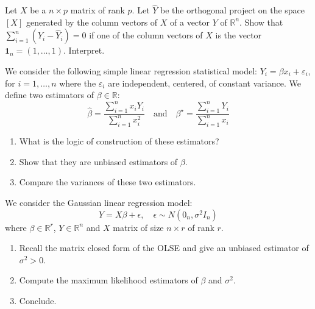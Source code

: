 \begin{exercise}
Let \(X\) be a \(n \times p\) matrix of rank \(p\). Let \(\hat{Y}\) be the orthogonal project on the space \([X]\) generated by the column vectors of \(X\) of a vector \(Y\) of \(\mathbb{R}^n\). Show that \(\sum_{i=1}^n (Y_i - \hat{Y}_i) = 0\) if one of the column vectors of \(X\) is the vector \(\mathbf{1}_n = (1, \ldots, 1)\). Interpret.
\end{exercise}

\begin{exercise}
We consider the following simple linear regression statistical model: \(Y_i = \beta x_i + \varepsilon_i\), for \(i = 1, \ldots, n\) where the \(\varepsilon_i\) are independent, centered, of constant variance. We define two estimators of \(\beta \in \mathbb{R}\):
\[\hat{\beta} = \frac{\sum_{i=1}^n x_i Y_i}{\sum_{i=1}^n x_i^2} \quad \text{and} \quad \beta^{\star} = \frac{\sum_{i=1}^n Y_i}{\sum_{i=1}^n x_i}\]

\begin{enumerate}
    \item What is the logic of construction of these estimators?
    \item Show that they are unbiased estimators of \(\beta\).
    \item Compare the variances of these two estimators.
\end{enumerate}
\end{exercise}

\begin{exercise}
We consider the Gaussian linear regression model:
\[Y = X\beta + \epsilon, \quad \epsilon \sim N(0_n, \sigma^2 I_n)\]
where \(\beta \in \mathbb{R}^r\), \(Y \in \mathbb{R}^n\) and \(X\) matrix of size \(n \times r\) of rank \(r\).

\begin{enumerate}
    \item Recall the matrix closed form of the OLSE and give an unbiased estimator of \(\sigma^2 > 0\).
    \item Compute the maximum likelihood estimators of \(\beta\) and \(\sigma^2\).
    \item Conclude.
\end{enumerate}
\end{exercise}

